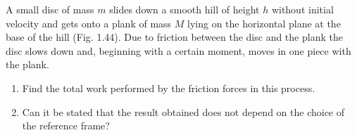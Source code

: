 \item A small disc of mass \( m \) slides down a smooth hill of height \( h \) without initial velocity and gets onto a plank of mass \( M \) lying on the horizontal plane at the base of the hill (Fig. 1.44). Due to friction between the disc and the plank the disc slows down and, beginning with a certain moment, moves in one piece with the plank.
    \begin{center}
    \end{center}
    \begin{enumerate}
        \item Find the total work performed by the friction forces in this process.
        \item Can it be stated that the result obtained does not depend on the choice of the reference frame?
    \end{enumerate}\begin{solution}
    \begin{center}
    \end{center}


\end{solution}
